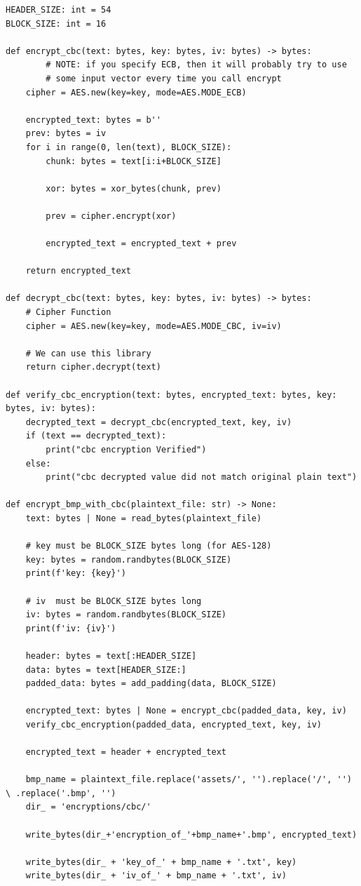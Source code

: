 \documentclass[11pt]{article}
\begin{document}
\begin{lstlisting}
HEADER_SIZE: int = 54
BLOCK_SIZE: int = 16

def encrypt_cbc(text: bytes, key: bytes, iv: bytes) -> bytes:
		# NOTE: if you specify ECB, then it will probably try to use
		# some input vector every time you call encrypt
    cipher = AES.new(key=key, mode=AES.MODE_ECB)

    encrypted_text: bytes = b''
    prev: bytes = iv
    for i in range(0, len(text), BLOCK_SIZE):
        chunk: bytes = text[i:i+BLOCK_SIZE]

        xor: bytes = xor_bytes(chunk, prev)

        prev = cipher.encrypt(xor) 

        encrypted_text = encrypted_text + prev

    return encrypted_text 

def decrypt_cbc(text: bytes, key: bytes, iv: bytes) -> bytes:
    # Cipher Function
    cipher = AES.new(key=key, mode=AES.MODE_CBC, iv=iv)
    
    # We can use this library
    return cipher.decrypt(text)

def verify_cbc_encryption(text: bytes, encrypted_text: bytes, key: bytes, iv: bytes):
    decrypted_text = decrypt_cbc(encrypted_text, key, iv)
    if (text == decrypted_text):
        print("cbc encryption Verified")
    else:
        print("cbc decrypted value did not match original plain text")

def encrypt_bmp_with_cbc(plaintext_file: str) -> None:
    text: bytes | None = read_bytes(plaintext_file)

    # key must be BLOCK_SIZE bytes long (for AES-128)
    key: bytes = random.randbytes(BLOCK_SIZE)
    print(f'key: {key}')

    # iv  must be BLOCK_SIZE bytes long
    iv: bytes = random.randbytes(BLOCK_SIZE)
    print(f'iv: {iv}')
    
    header: bytes = text[:HEADER_SIZE]
    data: bytes = text[HEADER_SIZE:]
    padded_data: bytes = add_padding(data, BLOCK_SIZE)

    encrypted_text: bytes | None = encrypt_cbc(padded_data, key, iv)    
    verify_cbc_encryption(padded_data, encrypted_text, key, iv)

    encrypted_text = header + encrypted_text

    bmp_name = plaintext_file.replace('assets/', '').replace('/', '') \ .replace('.bmp', '')
    dir_ = 'encryptions/cbc/'

    write_bytes(dir_+'encryption_of_'+bmp_name+'.bmp', encrypted_text)

    write_bytes(dir_ + 'key_of_' + bmp_name + '.txt', key)
    write_bytes(dir_ + 'iv_of_' + bmp_name + '.txt', iv)
\end{lstlisting}
\end{document}
